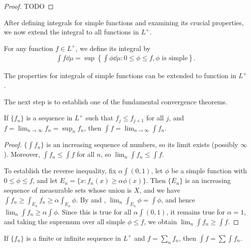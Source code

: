 \begin{proof}
    TODO
\end{proof}

After defining integrals for simple functions and examining its crucial properties, we now extend the integral to all functions in $L^+$.

\begin{definition}
    For any function $f \in L^+$, we define its integral by
    \begin{align}
        \int f \dd \mu = \sup \left\{ \int \phi \dd \mu: 0 \le \phi \le f, \phi \text{ is simple} \right\}.
    \end{align}
\end{definition}

The properties for integrals of simple functions can be extended to function in $L^+$.

The next step is to establish one of the fundamental convergence theorems.

\begin{theorem}
    If $\{ f_n \}$ is a sequence in $L^+$ such that $f_j \le f_{j+1}$ for all $j$, and $f = \lim_{n \to \infty} f_n = \sup_{n} f_n$, then $\int f = \lim_{n \to \infty} \int f_n$.
\end{theorem}

\begin{proof}
    $\{ \int f_n \}$ is an increasing sequence of numbers, so its limit exists (possibly $\infty$). 
    Moreover, $\int f_n \le \int f$ for all $n$, so $\lim_{n} \int f_n \le \int f$.

    To establish the reverse inequality, fix $\alpha \int (0, 1)$, let $\phi$ be a simple function with $0 \le \phi \le f$, and let $E_n = \{ x: f_n(x) \ge \alpha \phi(x) \}$.
    Then $\{ E_n \}$ is an increasing sequence of measurable sets whose union is $X$, and we have $\int f_n \ge \int_{E_n} f_n \ge \alpha \int_{E_n} \phi$.
    By  and , $\lim_{n} \int_{E_n} \phi = \int \phi$, and hence $\lim_n \int f_n \ge \alpha \int \phi$.
    Since this is true for all $\alpha \int (0, 1)$, it remains true for $\alpha =1$, and taking the supremum over all simple $\phi \le f$, we obtain $\lim_n \int f_n \ge \int f$.
\end{proof}

\begin{theorem}
    If $\{ f_n \}$ is a finite or infinite sequence in $L^+$ and $f = \sum_{n} f_n$, then $\int f = \sum \int f_n$.
\end{theorem}

